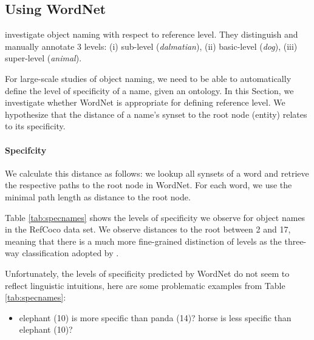 \documentclass[runningheads]{llncs}
\begin{document}
\subsection{Using WordNet}


\cite{graf2016animal} investigate object naming with respect to reference level. They distinguish and manually annotate 3 levels: (i) sub-level (\textit{dalmatian}), (ii) basic-level (\textit{dog}), (iii) super-level (\textit{animal}).

For large-scale studies of object naming, we need to be able to automatically define the level of specificity of a name, given an ontology. 
In this Section, we investigate whether WordNet is appropriate for defining reference level. We hypothesize that the distance of a name's synset to the root node (entity) relates to its specificity.

\paragraph{Specifcity} We calculate this distance as follows: we lookup all synsets of a word and retrieve the respective paths to the root node in WordNet. 
For each word, we use the minimal path length as distance to the root node.

Table \ref{tab:specnames} shows the levels of specificity we observe for object names in the RefCoco data set.
We observe distances to the root between 2 and 17, meaning that there is a much more fine-grained distinction of levels as the three-way classification adopted by \cite{graf2016animal}.

Unfortunately, the levels of specificity predicted by WordNet do not seem to reflect linguistic intuitions, here are some problematic examples from Table \ref{tab:specnames}:

\begin{itemize}
\item elephant (10) is more specific than panda (14)? horse is less specific than elephant (10)?
\end{itemize}
\end{document}
